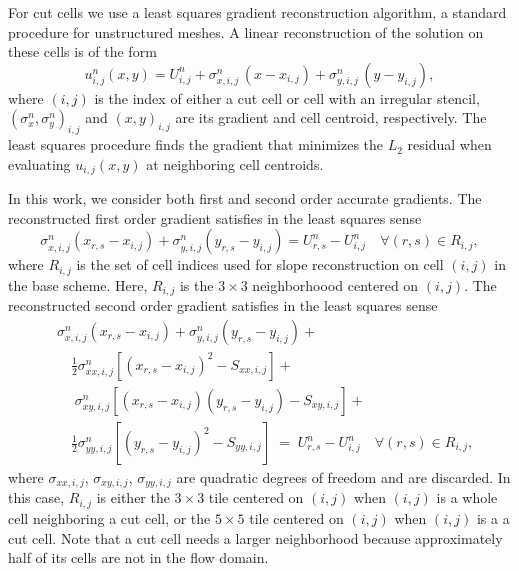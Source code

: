 For cut cells 
we use a least squares gradient reconstruction algorithm, a standard procedure
for unstructured meshes.
A linear reconstruction of the solution on these cells is of the form
\begin{equation}
u^n_{i,j}(x,y) = U_{i,j}^n + \sigma^n_{x,i,j} \,(x-x_{i,j}) +
                     \sigma^n_{y,i,j}\,(y-y_{i,j}),
\label{eqn:lls}
\end{equation}
where $(i,j)$ is the index of either a cut cell or cell with an irregular stencil, $(\sigma^n_{x},\sigma^n_{y})_{i,j}$ and $(x,y)_{i,j}$ are its gradient and cell centroid, respectively. The least squares procedure finds the gradient that minimizes the $L_2$ residual when evaluating  $u_{i,j}(x,y)$ at  
neighboring cell centroids. 

In this work, we consider both first and second order accurate 
gradients.  The reconstructed first order gradient satisfies in the 
least squares sense
\begin{equation}\label{eqn:linrecon_base}
\sigma^n_{x,i,j}(x_{r,s} - x_{i,j}) +
\sigma^n_{y,i,j}(y_{r,s} - y_{i,j})=
U^n_{r,s} - U^n_{i, j} \quad \forall (r,s) \in R_{i,j},
\end{equation}
where $R_{i,j}$ is the set of cell indices used for slope reconstruction on cell $(i,j)$ in the 
base scheme.  Here, $R_{i,j}$ is the $3\times 3$ neighborhoood  centered on $(i,j)$.
The reconstructed second order gradient satisfies in the least squares sense
\begin{equation}
\begin{aligned}\label{eqn:linrecon_base2}
&\sigma^n_{x,i,j}(x_{r,s} - x_{i,j}) +
\sigma^n_{y,i,j}(y_{r,s} - y_{i,j})  + \\
&\quad \frac{1}{2}\sigma^n_{xx,i,j}[(x_{r,s} - x_{i,j})^2 - S_{xx,i,j}]  + \\
& \quad \; \sigma^n_{xy,i,j}[(x_{r,s} - x_{i,j})(y_{r,s} - y_{i,j})-S_{xy,i,j}] +\\
&\quad  \frac{1}{2}\sigma^n_{yy,i,j}[(y_{r,s} - y_{i,j})^2 - S_{yy,i,j}]
 \; = \;  U^n_{r,s} - U^n_{i, j} \quad \forall (r,s) \in R_{i,j},
\end{aligned}
\end{equation}
where $\sigma_{xx,i,j}$, $\sigma_{xy,i,j}$, $\sigma_{yy,i,j}$ are quadratic degrees of freedom and are discarded.  In this case, $R_{i,j}$ is either the $3\times 3$ tile centered on $(i,j)$ when $(i,j)$ is a whole cell neighboring a cut cell, or the $5\times 5$ tile centered on $(i,j)$ when $(i,j)$ is a a cut cell.
Note that a cut cell needs a larger neighborhood because 
approximately half of its cells are not in the flow domain.  

